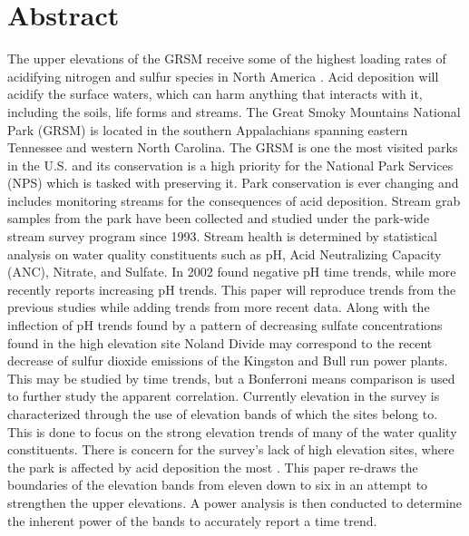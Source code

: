 \chapter*{Abstract}\label{ch:abstract}
The upper elevations of the GRSM receive some of the highest loading rates of acidifying nitrogen and sulfur species in North America \citep{johnson1992atmospheric}.  
Acid deposition will acidify the surface waters, which can harm anything that interacts with it, including the soils, life forms and streams.
The Great Smoky Mountains National Park (GRSM) is located in the southern Appalachians spanning eastern Tennessee and western North Carolina.
The GRSM is one the most visited parks in the U.S. and its conservation is a high priority for the National Park Services (NPS) which is tasked with preserving it.        
Park conservation is ever changing and  includes monitoring streams for the consequences of acid deposition.    
Stream grab samples from the park have been collected and studied under the park-wide stream survey program since 1993.
Stream health is determined by statistical analysis on water quality constituents such as pH, Acid Neutralizing Capacity (ANC), Nitrate, and Sulfate.
In 2002 \citet{robinson2008ph} found negative pH time trends, while more recently \citet{cai2013} reports increasing pH trends.
This paper will reproduce trends from the previous studies while adding trends from more recent data.
Along with the inflection of pH trends found by \citet{cai2013}  a pattern of decreasing sulfate concentrations found in the high elevation site Noland Divide may correspond to the recent decrease of sulfur dioxide emissions of the Kingston and Bull run power plants.
This may be studied by time trends, but a Bonferroni means comparison is used to further study the apparent correlation.
Currently elevation in the survey is characterized through the use of  elevation bands of which the sites belong to.
This is done to focus on the strong elevation trends of many of the water quality constituents.  %
There is concern for the survey's lack of high elevation sites, where the park is affected by acid deposition the most \citep{weathers2006}.
This paper re-draws the boundaries of the elevation bands from eleven down to six in an attempt to strengthen the upper elevations.
A power analysis is then conducted to determine the inherent power of the bands to accurately report a time trend.


